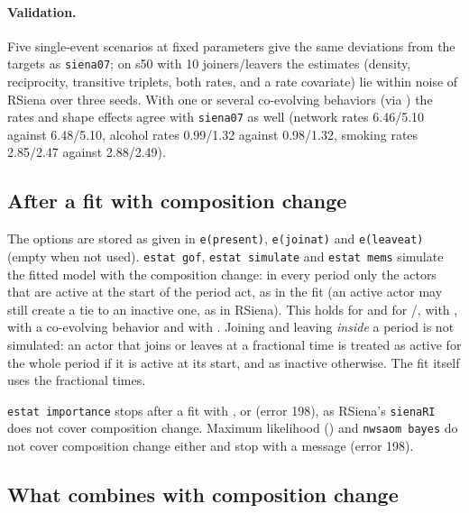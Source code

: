 \paragraph{Validation.} Five single-event scenarios at fixed parameters give the same deviations from the targets as \texttt{siena07}; on s50 with 10 joiners/leavers the estimates (density, reciprocity, transitive triplets, both rates, and a rate covariate) lie within noise of RSiena over three seeds. With one or several co-evolving behaviors (via ) the rates and shape effects agree with \texttt{siena07} as well (network rates 6.46/5.10 against 6.48/5.10, alcohol rates 0.99/1.32 against 0.98/1.32, smoking rates 2.85/2.47 against 2.88/2.49).

\subsection{After a fit with composition change}

The options are stored as given in \texttt{e(present)}, \texttt{e(joinat)} and \texttt{e(leaveat)} (empty when not used). \texttt{estat gof}, \texttt{estat simulate} and \texttt{estat mems} simulate the fitted model with the composition change: in every period only the actors that are active at the start of the period act, as in the fit (an active actor may still create a tie to an inactive one, as in RSiena). This holds for  and for /, with , with a co-evolving behavior and with . Joining and leaving \emph{inside} a period is not simulated: an actor that joins or leaves at a fractional time is treated as active for the whole period if it is active at its start, and as inactive otherwise. The fit itself uses the fractional times.

\texttt{estat importance} stops after a fit with ,  or  (error 198), as RSiena's \texttt{sienaRI} does not cover composition change. Maximum likelihood () and \texttt{nwsaom bayes} do not cover composition change either and stop with a message (error 198).

\subsection{What combines with composition change}

